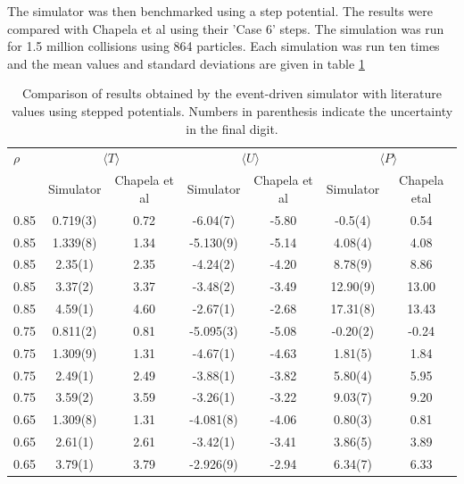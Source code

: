 \documentclass[12pt]{UoAthesis}
\begin{document}
The simulator was then benchmarked using a step potential. The results
were compared with Chapela et al \cite{Chapela1989} using their 'Case
6' steps. The simulation was run for 1.5 million collisions using 864
particles. Each simulation was run ten times and the mean values and
standard deviations are given in table
\ref{tab:benchsoft} 

\begin{table} 
  \caption{Comparison of results
    obtained by the event-driven simulator with literature values
    using stepped potentials. Numbers in parenthesis indicate the
    uncertainty in the final digit.
\label{tab:benchsoft}} 
  \begin{center} 
    \begin{tabular}{l c c c c c c} 
      \toprule
      $\rho$ & \multicolumn{2}{c}{$\langle T\rangle$} &
      \multicolumn{2}{c}{$\langle U \rangle$} &
      \multicolumn{2}{c}{$\langle P \rangle$}
      \\ \cmidrule(rl{0.75em}){2-3} \cmidrule(rl{0.75em}){4-5}
      \cmidrule(rl{0.75em}){6-7}& Simulator & Chapela et al &
      Simulator & Chapela et al & Simulator & Chapela etal\\ 
      \midrule
      0.85 & 0.719(3) & 0.72 & -6.04(7) & -5.80 & -0.5(4) & 0.54
      \\ 0.85& 1.339(8) & 1.34 & -5.130(9) & -5.14 & 4.08(4) & 4.08
      \\ 0.85 & 2.35(1) & 2.35 & -4.24(2) & -4.20 & 8.78(9) & 8.86
      \\ 0.85 & 3.37(2) & 3.37 & -3.48(2) & -3.49 & 12.90(9) & 13.00
      \\ 0.85 & 4.59(1) & 4.60 & -2.67(1) & -2.68 & 17.31(8) & 13.43
      \\ 0.75 & 0.811(2) & 0.81 & -5.095(3) & -5.08 & -0.20(2) & -0.24
      \\ 0.75 &1.309(9) & 1.31 & -4.67(1) & -4.63 & 1.81(5) & 1.84
      \\ 0.75 & 2.49(1) & 2.49 & -3.88(1) & -3.82 & 5.80(4) & 5.95
      \\ 0.75 & 3.59(2) & 3.59 & -3.26(1) & -3.22 & 9.03(7) & 9.20
      \\ 0.65 & 1.309(8) & 1.31 & -4.081(8) & -4.06 & 0.80(3) & 0.81
      \\0.65 & 2.61(1) & 2.61 & -3.42(1) & -3.41 & 3.86(5) & 3.89
      \\ 0.65 & 3.79(1) & 3.79 & -2.926(9) & -2.94 & 6.34(7) & 6.33
      \\ 
      \bottomrule 
    \end{tabular}
\end{center} 
\end{table} 
\end{document}
